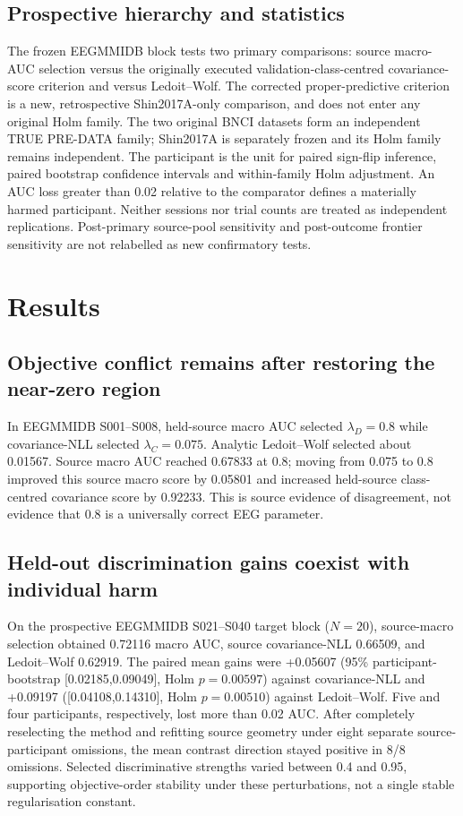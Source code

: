 \documentclass[11pt,a4paper]{article}
\begin{document}
\subsection{Prospective hierarchy and statistics}
The frozen EEGMMIDB block tests two primary comparisons: source macro-AUC
selection versus the originally executed validation-class-centred
covariance-score criterion and versus Ledoit--Wolf. The corrected
proper-predictive criterion is a new, retrospective Shin2017A-only
comparison, and does not enter any original Holm family.
The two original BNCI datasets form an independent TRUE PRE-DATA family;
Shin2017A is separately frozen and its Holm family remains independent.
The participant is the unit for paired sign-flip inference, paired bootstrap
confidence intervals and within-family Holm adjustment. An AUC loss
greater than 0.02 relative to the comparator defines a materially harmed
participant. Neither sessions nor trial counts are treated as independent
replications. Post-primary source-pool sensitivity and post-outcome frontier
sensitivity are not relabelled as new confirmatory tests.


\section{Results}
\subsection{Objective conflict remains after restoring the near-zero region}
In EEGMMIDB S001--S008, held-source macro AUC selected
\(\lambda_D=0.8\) while covariance-NLL selected \(\lambda_C=0.075\).
Analytic Ledoit--Wolf selected about 0.01567. Source macro AUC reached
0.67833 at 0.8; moving from 0.075 to 0.8 improved this source macro
score by 0.05801 and increased held-source class-centred covariance score by 0.92233.
This is source evidence of disagreement, not evidence that 0.8 is a
universally correct EEG parameter.

\subsection{Held-out discrimination gains coexist with individual harm}
On the prospective EEGMMIDB S021--S040 target block (\(N=20\)),
source-macro selection obtained 0.72116 macro AUC, source
covariance-NLL 0.66509, and Ledoit--Wolf 0.62919.
The paired mean gains were +0.05607 (95\% participant-bootstrap
[0.02185,0.09049], Holm \(p=0.00597\)) against covariance-NLL and
+0.09197 ([0.04108,0.14310], Holm \(p=0.00510\)) against
Ledoit--Wolf. Five and four participants, respectively, lost more
than 0.02 AUC. After completely reselecting the method and refitting
source geometry under eight separate source-participant omissions,
the mean contrast direction stayed positive in 8/8 omissions.
Selected discriminative strengths varied between 0.4 and 0.95,
supporting objective-order stability under these perturbations,
not a single stable regularisation constant.
\end{document}
